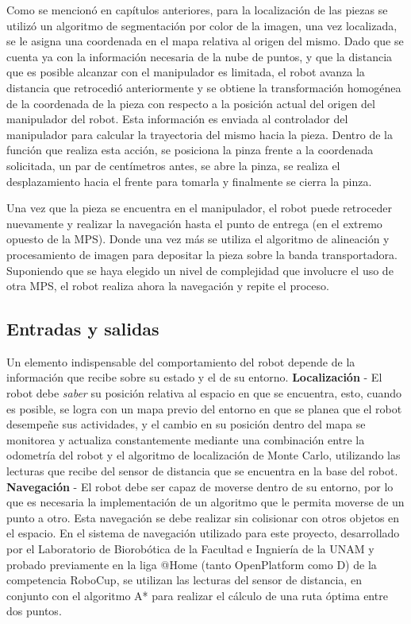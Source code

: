 Como se mencionó en capítulos anteriores, para la localización de las piezas se utilizó un algoritmo de segmentación por color de la imagen, una vez localizada, se le asigna una coordenada en el mapa relativa al origen del mismo. Dado que se cuenta ya con la información necesaria de la nube de puntos, y que la distancia que es posible alcanzar con el manipulador es limitada, el robot avanza la distancia que retrocedió anteriormente y se obtiene la transformación homogénea de la coordenada de la pieza con respecto a la posición actual del origen del manipulador del robot. Esta información es enviada al controlador del manipulador para calcular la trayectoria del mismo hacia la pieza. Dentro de la función que realiza esta acción, se posiciona la pinza frente a la coordenada solicitada, un par de centímetros antes, se abre la pinza, se realiza el desplazamiento hacia el frente para tomarla y finalmente se cierra la pinza. 

Una vez que la pieza se encuentra en el manipulador, el robot puede retroceder nuevamente y realizar la navegación hasta el punto de entrega (en el extremo opuesto de la MPS). Donde una vez más se utiliza el algoritmo de alineación y procesamiento de imagen para depositar la pieza sobre la banda transportadora. Suponiendo que se haya elegido un nivel de complejidad que involucre el uso de otra MPS, el robot realiza ahora la navegación y repite el proceso.

\subsection{Entradas y salidas}
Un elemento indispensable del comportamiento del robot depende de la información que recibe sobre su estado y el de su entorno.
\textbf{Localización} - El robot debe \textit{saber} su posición relativa al espacio en que se encuentra, esto, cuando es posible, se logra con un mapa previo del entorno en que se planea que el robot desempeñe sus actividades, y el cambio en su posición dentro del mapa se monitorea y actualiza constantemente mediante una combinación entre la odometría del robot y el algoritmo de localización de Monte Carlo, utilizando las lecturas que recibe del sensor de distancia que se encuentra en la  base del robot.
\textbf{Navegación} - El robot debe ser capaz de moverse dentro de su entorno, por lo que es necesaria la implementación de un algoritmo que le permita moverse de un punto a otro. Esta navegación se debe realizar sin colisionar con otros objetos en el espacio. En el sistema de navegación utilizado para este proyecto, desarrollado por el Laboratorio de Biorobótica de la Facultad e Ingniería de la UNAM y probado previamente en la liga @Home (tanto OpenPlatform como D) de la competencia RoboCup, se utilizan las lecturas del sensor de distancia, en conjunto con el algoritmo A* para realizar el cálculo de una ruta óptima entre dos puntos. 

